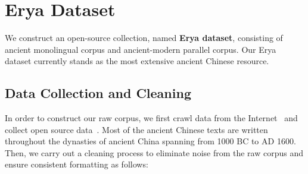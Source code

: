 \section{Erya Dataset}
We construct an open-source collection, named \textbf{Erya dataset}, consisting of ancient monolingual corpus and ancient-modern parallel corpus. Our Erya dataset currently stands as the most extensive ancient Chinese resource.


\subsection{Data Collection and Cleaning}                       
In order to construct our raw corpus, we first crawl data from the Internet~\cite{wyw5156} and collect open source data~\cite{TP-toolbox-web2,TP-toolbox-web3, TP-toolbox-web1,TP-toolbox-web4,TP-toolbox-web5,TP-toolbox-web6}. Most of the ancient Chinese texts are written throughout the dynasties of ancient China spanning from 1000 BC to AD 1600. Then, we carry out a cleaning process to eliminate noise from the raw corpus and ensure consistent formatting as follows:

